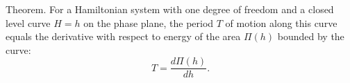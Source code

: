 Theorem. For a Hamiltonian system with one degree of freedom and a closed level curve $H = h$ on the phase plane, the period $T$ of motion along this curve equals the derivative with respect to energy of the area $\Pi(h)$ bounded by the curve:
$$T = \frac{d\Pi(h)}{dh}.$$
